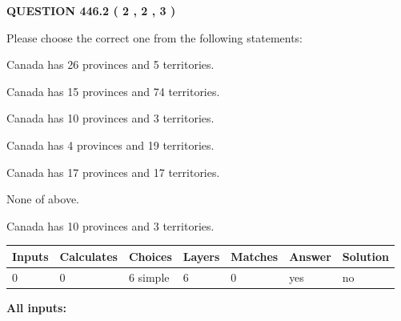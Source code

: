 \documentclass[12pt]{article}
\begin{document}
   
  
\vspace{0.2in}
  
{\textbf{\Large{QUESTION
446.2 
 ( 2 , 2 , 3 )
}}}
  
  
Please choose the correct one from the following statements:
 
 
Canada has  26 provinces and  5 territories.
 
 
Canada has  15 provinces and  74 territories.
 
 
Canada has 10  provinces and 3 territories.
 
 
Canada has   4 provinces and  19 territories.
 
 
Canada has  17 provinces and  17 territories.
 
 
 None of above.
 
 
\noindent{}
 
 
Canada has 10  provinces and 3 territories.
 
 
\noindent{}
 
 
   
   
   
   
\noindent\begin{tabular}{|l|l|l|l|l|l|l|}
 \hline
Inputs & Calculates & Choices & Layers & Matches & Answer & Solution \\ \hline
 0  & 
 0  & 
 6
  simple  
  & 
 6  & 
 0  & 
  yes & 
  no 
  \\ \hline
 \end{tabular}
   
   
   
   
\noindent{}
   
   
   
   
\noindent\vspace{0.1in}\hspace{-0.08in} {\textbf{\Large{All inputs: }}}
   
   
   
   
   
   
 \vspace{0.2in}
 
\end{document}
